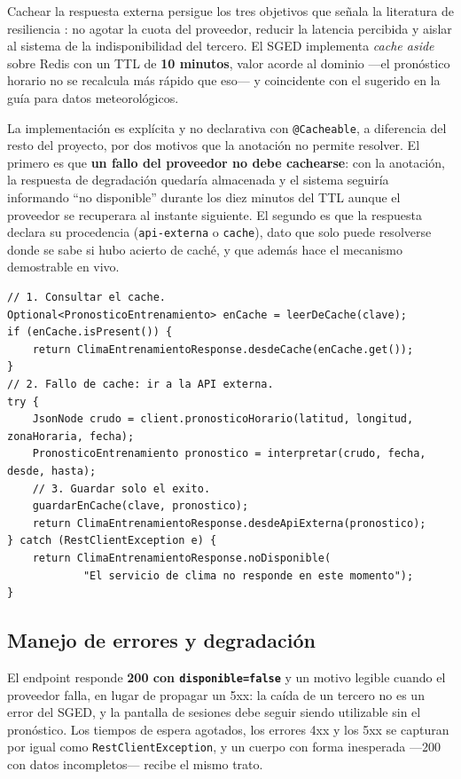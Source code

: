 \documentclass[12pt,a4paper]{article}
\begin{document}
Cachear la respuesta externa persigue los tres objetivos que señala la literatura de
resiliencia \parencite{nygard2018}: no agotar la cuota del proveedor, reducir la latencia
percibida y aislar al sistema de la indisponibilidad del tercero. El SGED implementa
\textit{cache aside} sobre Redis con un TTL de \textbf{10 minutos}, valor acorde al dominio ---el
pronóstico horario no se recalcula más rápido que eso--- y coincidente con el sugerido en la guía
para datos meteorológicos.

La implementación es explícita y no declarativa con \texttt{@Cacheable}, a diferencia del resto
del proyecto, por dos motivos que la anotación no permite resolver. El primero es que
\textbf{un fallo del proveedor no debe cachearse}: con la anotación, la respuesta de degradación
quedaría almacenada y el sistema seguiría informando ``no disponible'' durante los diez minutos
del TTL aunque el proveedor se recuperara al instante siguiente. El segundo es que la respuesta
declara su procedencia (\texttt{api-externa} o \texttt{cache}), dato que solo puede resolverse
donde se sabe si hubo acierto de caché, y que además hace el mecanismo demostrable en vivo.

\begin{lstlisting}[style=java, caption={Cache aside en ClimaService --- los tres pasos del patrón}]
// 1. Consultar el cache.
Optional<PronosticoEntrenamiento> enCache = leerDeCache(clave);
if (enCache.isPresent()) {
    return ClimaEntrenamientoResponse.desdeCache(enCache.get());
}
// 2. Fallo de cache: ir a la API externa.
try {
    JsonNode crudo = client.pronosticoHorario(latitud, longitud, zonaHoraria, fecha);
    PronosticoEntrenamiento pronostico = interpretar(crudo, fecha, desde, hasta);
    // 3. Guardar solo el exito.
    guardarEnCache(clave, pronostico);
    return ClimaEntrenamientoResponse.desdeApiExterna(pronostico);
} catch (RestClientException e) {
    return ClimaEntrenamientoResponse.noDisponible(
            "El servicio de clima no responde en este momento");
}
\end{lstlisting}

\subsection{Manejo de errores y degradación}

El endpoint responde \textbf{200 con \texttt{disponible=false}} y un motivo legible cuando el
proveedor falla, en lugar de propagar un 5xx: la caída de un tercero no es un error del SGED, y
la pantalla de sesiones debe seguir siendo utilizable sin el pronóstico. Los tiempos de espera
agotados, los errores 4xx y los 5xx se capturan por igual como \texttt{RestClientException}, y un
cuerpo con forma inesperada ---200 con datos incompletos--- recibe el mismo trato.
\end{document}
